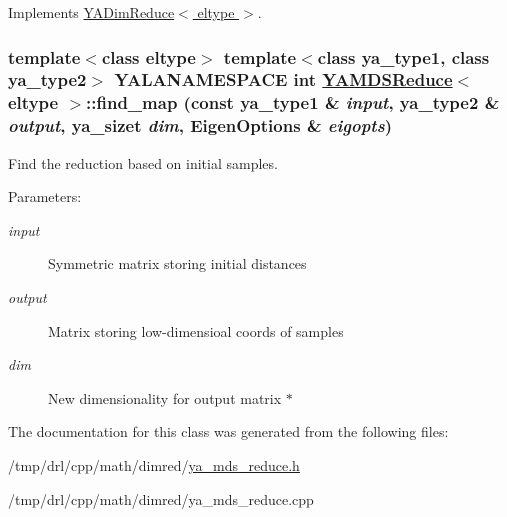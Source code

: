 Implements \hyperlink{class_y_a_dim_reduce_a8}{YADim\-Reduce$<$ eltype $>$}.\hypertarget{class_y_a_m_d_s_reduce_a5}{
\subsubsection[find\_\-map]{\setlength{\rightskip}{0pt plus 5cm}template$<$class eltype$>$ template$<$class ya\_\-type1, class ya\_\-type2$>$ YALANAMESPACE int \hyperlink{class_y_a_m_d_s_reduce}{YAMDSReduce}$<$ eltype $>$::find\_\-map (const ya\_\-type1 \& {\em input}, ya\_\-type2 \& {\em output}, ya\_\-sizet {\em dim}, Eigen\-Options \& {\em eigopts})}}
\label{class_y_a_m_d_s_reduce_a5}


Find the reduction based on initial samples. 

\begin{Desc}
\item[Parameters:]
\begin{description}
\item[{\em input}]Symmetric matrix storing initial distances \item[{\em output}]Matrix storing low-dimensioal coords of samples \item[{\em dim}]New dimensionality for output matrix $\ast$ \end{description}
\end{Desc}


The documentation for this class was generated from the following files:\begin{CompactItemize}
\item 
/tmp/drl/cpp/math/dimred/\hyperlink{ya__mds__reduce_8h}{ya\_\-mds\_\-reduce.h}\item 
/tmp/drl/cpp/math/dimred/ya\_\-mds\_\-reduce.cpp\end{CompactItemize}
